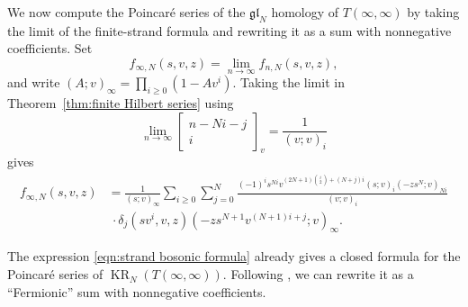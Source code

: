 \documentclass[reqno]{amsart}
\theoremstyle{definition}
\theoremstyle{remark}
\newcommand{\gl}{\mathfrak{gl}}
\DeclareMathOperator{\KR}{KR}
\begin{document}
We now compute the Poincar\'e series of the $\gl_N$ homology of $T(\infty,\infty)$ by taking the limit of the finite-strand formula and rewriting it as a sum with nonnegative coefficients. Set
\[f_{\infty,N}(s,v,z)=\lim_{n\to\infty}f_{n,N}(s,v,z),\]
and write $(A;v)_\infty=\prod_{i\ge0}(1-Av^i)$. Taking the limit in Theorem~\ref{thm:finite Hilbert series} using
\[\lim_{n\to\infty}\begin{bmatrix}n-Ni-j\\i\end{bmatrix}_v=\frac1{(v;v)_i}\]
gives
\begin{equation}\label{eqn:strand bosonic formula}
\begin{aligned}
f_{\infty,N}(s,v,z)&=\frac1{(s;v)_\infty}\sum_{i\ge0}\sum_{j=0}^N\frac{(-1)^is^{Ni}v^{(2N+1)\binom{i}{2}+(N+j)i}(s;v)_i(-zs^N;v)_{Ni}}{(v;v)_i}\\
&\ \cdot\delta_j(sv^i,v,z)(-zs^{N+1}v^{(N+1)i+j};v)_\infty.
\end{aligned}
\end{equation}

The expression \eqref{eqn:strand bosonic formula} already gives a closed formula for the Poincar\'e series of $\KR_N(T(\infty,\infty))$. Following \cite[Section 4.2]{gorsky2013stable}, we can rewrite it as a ``Fermionic'' sum with nonnegative coefficients.
\end{document}
